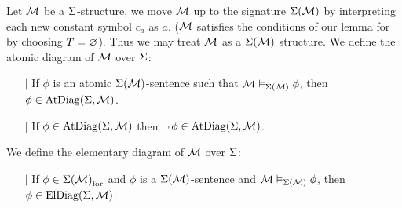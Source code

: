 \begin{dfn}
    Let $\mathcal{M}$ be a $\Sigma$-structure,
    we move $\mathcal{M}$ up to the signature $\Sigma(\mathcal{M})$
    by interpreting each new constant symbol $c_a$ as $a$.
    ($\mathcal{M}$ satisfies the conditions of our lemma for
    by choosing $T = \varnothing$).
    Thus we may treat $\mathcal{M}$ as a $\Sigma(\mathcal{M})$ structure.
    We define the atomic diagram of $\mathcal{M}$ over $\Sigma$:
    \begin{itemize}
        \item[$\vert$] If $\phi$ is an atomic
        $\Sigma(\mathcal{M})$-sentence such that $\mathcal{M} \vDash_{\Sigma(\mathcal{M})} \phi$,
        then $\phi \in \mathrm{AtDiag}(\Sigma,\mathcal{M})$.
        \item[$\vert$] If $\phi \in \mathrm{AtDiag}(\Sigma,\mathcal{M})$ then 
        $\neg\, \phi \in \mathrm{AtDiag}(\Sigma,\mathcal{M})$.
    \end{itemize}
    We define the elementary diagram of $\mathcal{M}$ over $\Sigma$:
    \begin{itemize}
        \item[$\vert$] If $\phi \in {\Sigma(\mathcal{M})}_\mathrm{for}$ and 
        $\phi$ is a $\Sigma(\mathcal{M})$-sentence and $\mathcal{M} \vDash_{\Sigma(\mathcal{M})} \phi$,
        then $\phi \in \mathrm{ElDiag}(\Sigma,\mathcal{M})$.
    \end{itemize}
\end{dfn}

